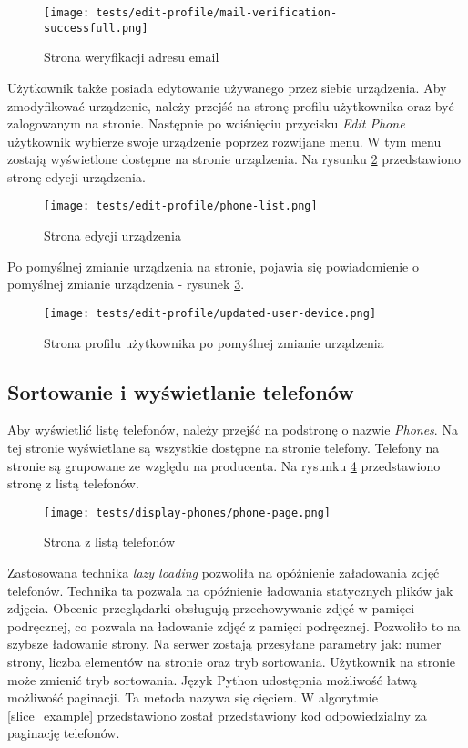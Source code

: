 \begin{figure}[H]
  \centering
  \texttt{[image: tests/edit-profile/mail-verification-successfull.png]}
  \caption{Strona weryfikacji adresu email}
  \label{verify_email_page}
\end{figure}
Użytkownik także posiada edytowanie używanego przez siebie urządzenia. Aby zmodyfikować urządzenie, należy przejść na stronę profilu użytkownika oraz być zalogowanym na stronie. Następnie po wciśnięciu przycisku \textit{Edit Phone} użytkownik wybierze swoje urządzenie poprzez rozwijane menu. W tym menu zostają wyświetlone dostępne na stronie urządzenia. Na rysunku \ref{edit_phone} przedstawiono stronę edycji urządzenia.
\begin{figure}[H]
  \centering
  \texttt{[image: tests/edit-profile/phone-list.png]}
  \caption{Strona edycji urządzenia}
  \label{edit_phone}
\end{figure}
Po pomyślnej zmianie urządzenia na stronie, pojawia się powiadomienie o pomyślnej zmianie urządzenia - rysunek \ref{edit_phone_success}.
\begin{figure}[H]
  \centering
  \texttt{[image: tests/edit-profile/updated-user-device.png]}
  \caption{Strona profilu użytkownika po pomyślnej zmianie urządzenia}
  \label{edit_phone_success}
\end{figure}

\subsection{Sortowanie i wyświetlanie telefonów}
Aby wyświetlić listę telefonów, należy przejść na podstronę o nazwie \textit{Phones}. Na tej stronie wyświetlane są wszystkie dostępne na stronie telefony. Telefony na stronie są grupowane ze względu na producenta. Na rysunku \ref{phones_page} przedstawiono stronę z listą telefonów.
\begin{figure}[H]
  \centering
  \texttt{[image: tests/display-phones/phone-page.png]}
  \caption{Strona z listą telefonów}
  \label{phones_page}
\end{figure}
Zastosowana technika \textit{lazy loading} pozwoliła na opóźnienie załadowania zdjęć telefonów. Technika ta pozwala na opóźnienie ładowania statycznych plików jak zdjęcia. Obecnie przeglądarki obsługują przechowywanie zdjęć w pamięci podręcznej, co pozwala na ładowanie zdjęć z pamięci podręcznej. Pozwoliło to na szybsze ładowanie strony. Na serwer zostają przesyłane parametry jak: numer strony, liczba elementów na stronie oraz tryb sortowania. Użytkownik na stronie może zmienić tryb sortowania. Język Python udostępnia możliwość łatwą możliwość paginacji. Ta metoda nazywa się cięciem. W algorytmie \ref{slice_example} przedstawiono został przedstawiony kod odpowiedzialny za paginację telefonów.

